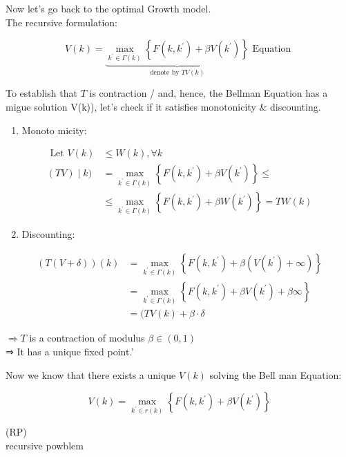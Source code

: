 \documentclass[10pt]{article}
\begin{document}
Now let's go back to the optimal Growth model.\\
The recursive formulation:

$$
V(k)=\underbrace{\max _{k^{\prime} \in \Gamma(k)}\left\{F\left(k, k^{\prime}\right)+\beta V\left(k^{\prime}\right)\right\}}_{\text {denote by } T V(k)} \text { Equation }
$$

To establish that $T$ is contraction / and, hence, the Bellman Equation has a migue solution V(k)), let's check if it satisfies monotonicity \& discounting.

\begin{enumerate}
  \item Monoto micity:
\end{enumerate}

$$
\begin{aligned}
\text { Let } V(k) & \leqslant W(k), \forall k \\
(T V) \mid k) & =\max _{k^{\prime} \in \Gamma(k)}\left\{F\left(k, k^{\prime}\right)+\beta V\left(k^{\prime}\right)\right\} \leqslant \\
& \leqslant \max _{k^{\prime} \in \Gamma(k)}\left\{F\left(k, k^{\prime}\right)+\beta W\left(k^{\prime}\right)\right\}=T W(k)
\end{aligned}
$$

\begin{enumerate}
  \setcounter{enumi}{1}
  \item Discounting:
\end{enumerate}

$$
\begin{aligned}
(T(V+\delta))(k) & =\max _{k^{\prime} \in \Gamma(k)}\left\{F\left(k, k^{\prime}\right)+\beta\left(V\left(k^{\prime}\right)+\infty\right)\right\} \\
& =\max _{k^{\prime} \in \Gamma(k)}\left\{F\left(k, k^{\prime}\right)+\beta V\left(k^{\prime}\right)+\beta \infty\right\} \\
& =(T V(k)+\beta \cdot \delta
\end{aligned}
$$

$\Rightarrow T$ is a contraction of modulus $\beta \in(0,1)$\\
⇒ It has a unique fixed point.'

Now we know that there exists a unique $V(k)$ solving the Bell man Equation:

$$
V(k)=\max _{k^{\prime} \in r(k)}\left\{F\left(k, k^{\prime}\right)+\beta V\left(k^{\prime}\right)\right\}
$$

(RP)\\
recursive powblem
\end{document}
